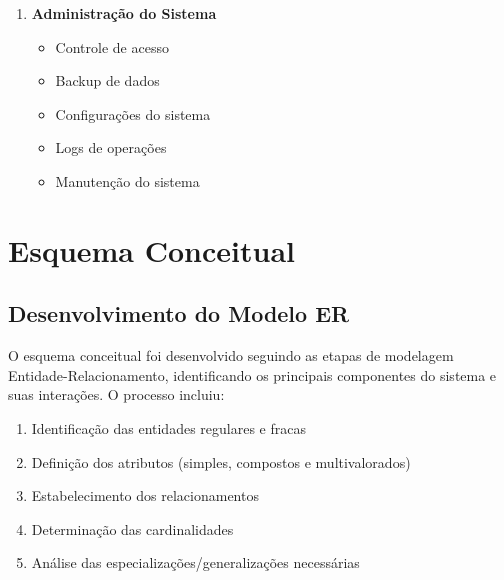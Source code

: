 \documentclass[12pt,a4paper]{article}
\begin{document}
\begin{tcolorbox}[title=Operações Principais]
\begin{enumerate}[label=\textbf{OP\arabic*.}]
    \item \textbf{Administração do Sistema}
    \begin{itemize}
        \item Controle de acesso
        \item Backup de dados
        \item Configurações do sistema
        \item Logs de operações
        \item Manutenção do sistema
    \end{itemize}
\end{enumerate}
\end{tcolorbox}



\section{Esquema Conceitual}

\subsection{Desenvolvimento do Modelo ER}
O esquema conceitual foi desenvolvido seguindo as etapas de modelagem Entidade-Relacionamento, identificando os principais componentes do sistema e suas interações. O processo incluiu:

\begin{enumerate}
    \item Identificação das entidades regulares e fracas
    \item Definição dos atributos (simples, compostos e multivalorados)
    \item Estabelecimento dos relacionamentos
    \item Determinação das cardinalidades
    \item Análise das especializações/generalizações necessárias
\end{enumerate}
\end{document}
